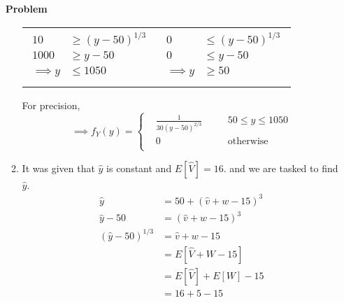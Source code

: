 \documentclass[12pt]{article}
\newenvironment{Ex}{\textbf{Problem}\vspace{.75em}\\}{}
\begin{document}
\begin{enumerate}
\begin{Ex}
\begin{solution}
\begin{enumerate}
\begin{table}[H]
          \label{eq:4b-limits}
          \begin{tabularx}{\linewidth}{XX}
            \begin{equation}
              \begin{aligned}
                10 &\ge(y-50)^{1/3} \\
                1000 &\ge y-50 \\
                \implies y &\le 1050 \\
              \end{aligned}
            \end{equation}
            &
            \begin{equation}
              \begin{aligned}
                0 &\le (y-50)^{1/3} \\
                0 &\le y-50 \\
                \implies y &\ge 50 \\
              \end{aligned}
            \end{equation}
          \end{tabularx}
        \end{table}
        For precision,
        \begin{equation}
          \label{eq:4b-sol}
          \implies f_Y(y) = \left \{
            \begin{aligned}
              & \frac{1}{30 (y-50)^{2/3}} &&\quad 50\le y\le 1050 \\
              & 0 &&\quad\text{otherwise} \\
            \end{aligned} \right.
        \end{equation}
      \item It was given that $\hat{y}$ is constant and
        $E[\hat{V}]=16$. and we are tasked to find $\hat{y}$.
        \begin{equation}
          \label{eq:4c-sol}
          \begin{aligned}
            \hat{y} &= 50 + (\hat{v} + w - 15)^3 \\
            \hat{y} - 50 &= (\hat{v} + w - 15)^3 \\
            (\hat{y} - 50)^{1/3} &= \hat{v} + w - 15 \\
            &= E[\hat{V} + W - 15] \\
            &= E[\hat{V}] + E[W] - 15 \\
            &= 16+5-15 \\

\end{aligned}
\end{equation}
\end{enumerate}
\end{solution}
\end{Ex}
\end{enumerate}
\end{document}
